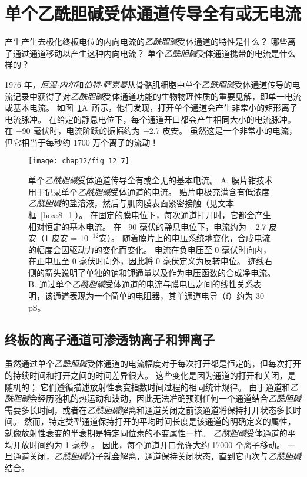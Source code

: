 \section{单个乙酰胆碱受体通道传导全有或无电流}

产生产生去极化终板电位的内向电流的\textit{乙酰胆碱}受体通道的特性是什么？
哪些离子通过通道移动以产生这种内向电流？
单个\textit{乙酰胆碱}受体通道携带的电流是什么样的？


1976 年，\textit{厄温$\cdot$内尔}和\textit{伯特$\cdot$萨克曼}从骨骼肌细胞中单个\textit{乙酰胆碱}受体通道传导的电流记录中获得了对\textit{乙酰胆碱}受体通道功能的生物物理性质的重要见解，即单一电流或基本电流。
如图~\ref{fig:12_7}A~所示，他们发现，打开单个通道会产生非常小的矩形离子电流脉冲。
在给定的静息电位下，每个通道开口都会产生相同大小的电流脉冲。
在 −90 毫伏时，电流阶跃的振幅约为 −2.7 皮安。 
虽然这是一个非常小的电流，但它相当于每秒约 1700 万个离子的流动！


\begin{figure}[htbp]
	\centering
	\texttt{[image: chap12/fig\_12\_7]}
	\caption{单个\textit{乙酰胆碱}受体通道传导全有或全无的基本电流。
		A. 膜片钳技术用于记录单个\textit{乙酰胆碱}受体通道的电流。
		贴片电极充满含有低浓度\textit{乙酰胆碱}的盐溶液，然后与肌肉膜表面紧密接触（见文本框~\ref{box:8_1}）。
		在固定的膜电位下，每次通道打开时，它都会产生相对恒定的基本电流。
		在 –90 毫伏的静息电位下，电流约为 −2.7 皮安（1 皮安 = $10^{-12}$安）。
		随着膜片上的电压系统地变化，合成电流的幅度会因驱动力的变化而变化。
		电流在负电压至 0 毫伏时向内，在正电压至 0 毫伏时向外，因此将 0 毫伏定义为反转电位。
		迹线右侧的箭头说明了单独的钠和钾通量以及作为电压函数的合成净电流。
		B. 通过单个\textit{乙酰胆碱}受体通道的电流与膜电压之间的线性关系表明，该通道表现为一个简单的电阻器，其单通道电导（f）约为 30 pS。}
	\label{fig:12_7}
\end{figure}



\subsection{终板的离子通道可渗透钠离子和钾离子}

虽然通过单个\textit{乙酰胆碱}受体通道的电流幅度对于每次打开都是恒定的，但每次打开的持续时间和打开之间的时间差异很大。
这些变化是因为通道的打开和关闭，是随机的；
它们遵循描述放射性衰变指数时间过程的相同统计规律。 
由于通道和\textit{乙酰胆碱}会经历随机的热运动和波动，因此无法准确预测任何一个通道结合\textit{乙酰胆碱}需要多长时间，或者在\textit{乙酰胆碱}解离和通道关闭之前该通道将保持打开状态多长时间。
然而，特定类型通道保持打开的平均时间长度是该通道的明确定义的属性，就像放射性衰变的半衰期是特定同位素的不变属性一样。
\textit{乙酰胆碱}受体通道的平均开放时间约为 1 毫秒 。
因此，每个通道开口允许大约 17000 个离子移动。
一旦通道关闭，\textit{乙酰胆碱}分子就会解离，通道保持关闭状态，直到它再次与\textit{乙酰胆碱}结合。


